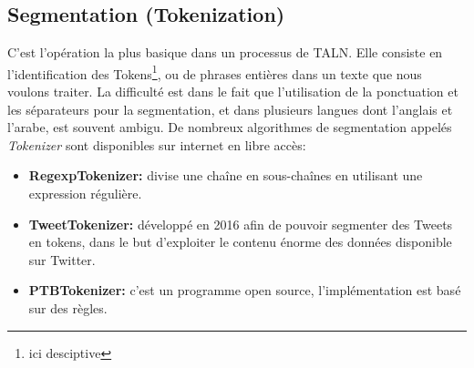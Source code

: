 \documentclass{report}
\begin{document}
    
\subsection{Segmentation (Tokenization)}
C'est l'opération la plus basique dans un processus de TALN. Elle consiste en l'identification des Tokens\footnote{ici desciptive}, ou de phrases entières dans un texte que nous voulons traiter. La difficulté est dans le fait que l'utilisation de la ponctuation et les séparateurs pour la segmentation, et dans plusieurs langues dont l'anglais et l'arabe, est souvent ambigu.     
De nombreux algorithmes de segmentation appelés \emph{Tokenizer} sont disponibles sur internet en libre accès:
\begin{itemize}
    \item \textbf{RegexpTokenizer:} divise une chaîne en sous-chaînes en utilisant une expression régulière.
    \item \textbf{TweetTokenizer:} développé en 2016 afin de pouvoir segmenter des Tweets en tokens, dans le but d'exploiter le contenu énorme des données disponible sur Twitter.
    \item \textbf{PTBTokenizer:} c'est un programme open source, l’implémentation est basé sur des règles.  
\end{itemize}
\end{document}
